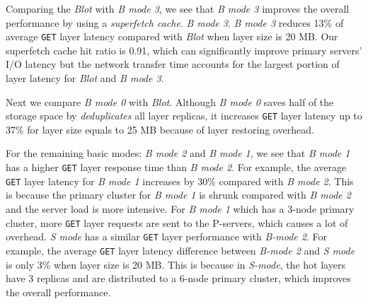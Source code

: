 Comparing the \emph{Blot} with \emph{B mode 3},
we see that \emph{B mode 3} improves the overall performance by using a \emph{superfetch cache}.
\emph{B mode 3}.
\emph{B mode 3} reduces 13\% of average \texttt{GET} layer latency
compared with \emph{Blot} when layer size is 20 MB.
Our superfetch cache hit ratio is 0.91,
which can significantly improve primary servers' I/O latency but 
the network transfer time accounts for the largest portion of 
layer latency for \emph{Blot} and \emph{B mode 3}.

Next we compare \emph{B mode 0} with \emph{Blot}.
Although \emph{B mode 0} saves half of the storage space
by \emph{deduplicates} all layer replicas,
it increases \texttt{GET} layer latency up to 37\% for layer size equals to 25 MB
because of layer restoring overhead.

For the remaining basic modes: \emph{B mode 2} and \emph{B mode 1},
we see that \emph{B mode 1} has a higher \texttt{GET} layer response time 
than \emph{B mode 2}.
For example,
the average \texttt{GET} layer latency for \emph{B mode 1} increases by 30\%
compared with \emph{B mode 2}.
This is because the primary cluster for \emph{B mode 1} is shrunk compared with
\emph{B mode 2}
and the server load is more intensive.
For \emph{B mode 1} which has a 3-node primary cluster,
more \texttt{GET} layer requests are sent to the P-servers,
which causes a lot of overhead.
\emph{S mode} has a similar \texttt{GET} layer performance with \emph{B-mode 2}.
For example,
the average \texttt{GET} layer latency difference between \emph{B-mode 2}
and \emph{S mode} is only 3\% when layer size is 20 MB.
This is because in \emph{S-mode}, 
the hot layers have 3 replicas
and are distributed to a 6-node primary cluster, 
which improves the overall performance.



